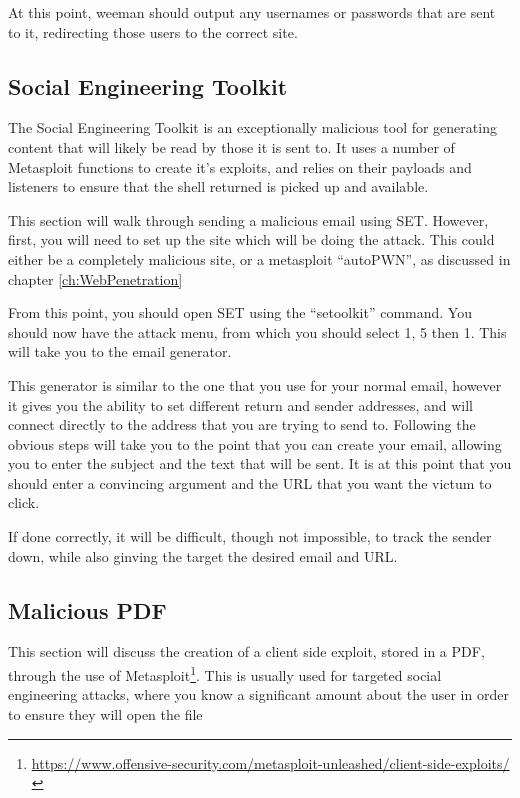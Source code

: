 			At this point, weeman should output any usernames or passwords that are sent to it, redirecting those users to the correct site. 
		\subsection{Social Engineering Toolkit}
			The Social Engineering Toolkit is an exceptionally malicious tool for generating content that will likely be read by those it is sent to. 
			It uses a number of Metasploit functions to create it's exploits, and relies on their payloads and listeners to ensure that the shell returned is picked up and available. 

			This section will walk through sending a malicious email using SET. 
			However, first, you will need to set up the site which will be doing the attack. 
			This could either be a completely malicious site, or a metasploit ``autoPWN'', as discussed in chapter \ref{ch:WebPenetration}

			From this point, you should open SET using the ``setoolkit'' command. 
			You should now have the attack menu, from which you should select 1, 5 then 1. 
			This will take you to the email generator. 

			This generator is similar to the one that you use for your normal email, however it gives you the ability to set different return and sender addresses, and will connect directly to the address that you are trying to send to. 
			Following the obvious steps will take you to the point that you can create your email, 
			allowing you to enter the subject and the text that will be sent. 
			It is at this point that you should enter a convincing argument and the URL that you want the victum to click. 

			If done correctly, it will be difficult, though not impossible, to track the sender down, while also ginving the target the desired email and URL. 

		\subsection{Malicious PDF}
			This section will discuss the creation of a client side exploit, stored in a PDF, through the use of Metasploit\footnote{\url{https://www.offensive-security.com/metasploit-unleashed/client-side-exploits/}}.
			This is usually used for targeted social engineering attacks, where you know a significant amount about the user in order to ensure they will open the file\cite{MSFU} 

